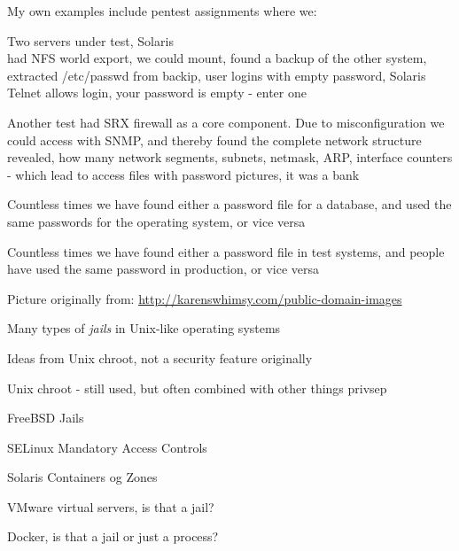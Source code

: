 \documentclass[20pt,landscape,a4paper,footrule]{foils}
\begin{document}

\begin{list1}
\item My own examples include pentest assignments where we:
\begin{list2}
\item Two servers under test, Solaris\\
had NFS world export, we could mount, found a backup of the other system, extracted /etc/passwd from backip, user logins with empty password, Solaris Telnet allows login, your password is empty - enter one
\item Another test had SRX firewall as a core component. Due to misconfiguration we could access with SNMP, and thereby found the complete network structure revealed, how many network segments, subnets, netmask, ARP, interface counters - which lead to access files with password pictures, it was a bank
\item Countless times we have found either a password file for a database, and used the same passwords for the operating system, or vice versa
\item Countless times we have found either a password file in test systems, and people have used the same password in production, or vice versa
\end{list2}
\end{list1}



\centerline{Picture originally from: \url{http://karenswhimsy.com/public-domain-images}}



\begin{list1}
\item Many types of \emph{jails} in Unix-like operating systems
\item Ideas from Unix chroot, not a security feature originally
\begin{list2}
\item Unix chroot - still used, but often combined with other things privsep
\item FreeBSD Jails
\item SELinux Mandatory Access Controls
\item Solaris Containers og Zones
\item VMware virtual servers, is that a jail?
\item Docker, is that a jail or just a process?
\end{list2}
\end{list1}
\end{document}
